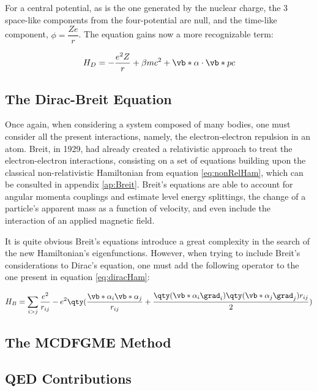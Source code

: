 For a central potential, as is the one generated by the nuclear charge, the 3 space-like components from the four-potential are null, and the time-like component, $\phi=\dfrac{Z e}{r}$. The equation gains now a more recognizable term:

\begin{equation}
    H_D=-\frac{e^2 Z}{r} + \beta m c^2 + \vb*{\alpha}\cdot\vb*{p}c
    \label{eq:diracHam}
\end{equation}

\subsection{The Dirac-Breit Equation}

Once again, when considering a system composed of many bodies, one must consider all the present interactions, namely, the electron-electron repulsion in an atom.
 Breit, in 1929, had already created a relativistic approach to treat the electron-electron interactions, consisting on a set of equations building upon the classical non-relativistic Hamiltonian from equation \eqref{eq:nonRelHam}, which can be consulted in appendix \ref{ap:Breit}.
  Breit's equations are able to account for angular momenta couplings and estimate level energy splittings, the change of a particle's apparent mass as a function of velocity, and even include the interaction of an applied magnetic field.\cite{Bethe1977}

  It is quite obvious Breit's equations introduce a great complexity in the search of the new Hamiltonian's eigenfunctions. However, when trying to include Breit's considerations to Dirac's equation, one must add the following operator to the one present in equation \eqref{eq:diracHam}:

  \begin{equation}
    H_B = \sum_{i>j}\frac{e^2}{r_{ij}} - e^2\qty(\frac{\vb*{\alpha}_i\vb*{\alpha}_j}{r_{ij}}+\frac{\qty(\vb*{\alpha}_i \grad_i)\qty(\vb*{\alpha}_j \grad_j)r_{ij}}{2})  
  \end{equation}

\subsection{The \gls{MCDFGME} Method}




\subsection{QED Contributions}
